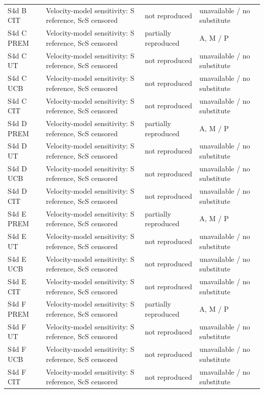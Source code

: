 \documentclass[10pt]{article}
\begin{document}
\begin{longtable}{p{.23\linewidth}p{.25\linewidth}p{.19\linewidth}p{.22\linewidth}}
S4d B CIT & Velocity-model sensitivity: S reference, ScS censored & not reproduced & unavailable / no substitute \\
S4d C PREM & Velocity-model sensitivity: S reference, ScS censored & partially reproduced & A, M / P \\
S4d C UT & Velocity-model sensitivity: S reference, ScS censored & not reproduced & unavailable / no substitute \\
S4d C UCB & Velocity-model sensitivity: S reference, ScS censored & not reproduced & unavailable / no substitute \\
S4d C CIT & Velocity-model sensitivity: S reference, ScS censored & not reproduced & unavailable / no substitute \\
S4d D PREM & Velocity-model sensitivity: S reference, ScS censored & partially reproduced & A, M / P \\
S4d D UT & Velocity-model sensitivity: S reference, ScS censored & not reproduced & unavailable / no substitute \\
S4d D UCB & Velocity-model sensitivity: S reference, ScS censored & not reproduced & unavailable / no substitute \\
S4d D CIT & Velocity-model sensitivity: S reference, ScS censored & not reproduced & unavailable / no substitute \\
S4d E PREM & Velocity-model sensitivity: S reference, ScS censored & partially reproduced & A, M / P \\
S4d E UT & Velocity-model sensitivity: S reference, ScS censored & not reproduced & unavailable / no substitute \\
S4d E UCB & Velocity-model sensitivity: S reference, ScS censored & not reproduced & unavailable / no substitute \\
S4d E CIT & Velocity-model sensitivity: S reference, ScS censored & not reproduced & unavailable / no substitute \\
S4d F PREM & Velocity-model sensitivity: S reference, ScS censored & partially reproduced & A, M / P \\
S4d F UT & Velocity-model sensitivity: S reference, ScS censored & not reproduced & unavailable / no substitute \\
S4d F UCB & Velocity-model sensitivity: S reference, ScS censored & not reproduced & unavailable / no substitute \\
S4d F CIT & Velocity-model sensitivity: S reference, ScS censored & not reproduced & unavailable / no substitute \\

\end{longtable}
\end{document}
